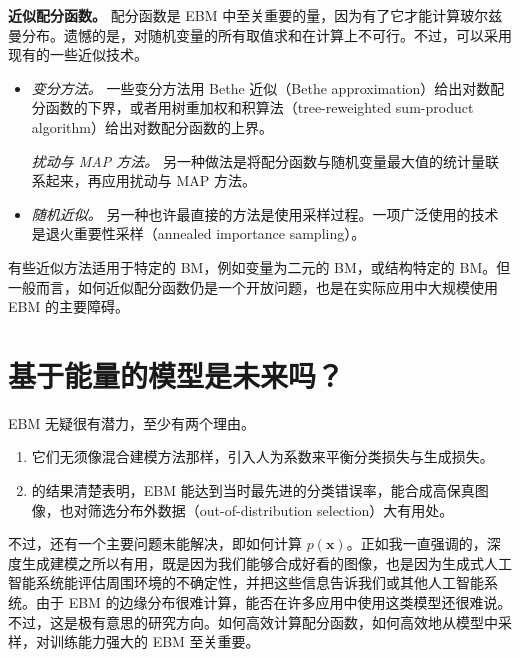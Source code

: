 \noindent\textbf{近似配分函数。} 配分函数是 EBM 中至关重要的量，因为有了它才能计算玻尔兹曼分布。遗憾的是，对随机变量的所有取值求和在计算上不可行。不过，可以采用现有的一些近似技术。
\begin{itemize}
\item \emph{变分方法。} 一些变分方法用 Bethe 近似（Bethe approximation）给出对数配分函数的下界，或者用树重加权和积算法（tree-reweighted sum-product algorithm）给出对数配分函数的上界。

\emph{扰动与 MAP 方法。} 另一种做法是将配分函数与随机变量最大值的统计量联系起来，再应用扰动与 MAP 方法。
\item \emph{随机近似。} 另一种也许最直接的方法是使用采样过程。一项广泛使用的技术是退火重要性采样（annealed importance sampling）。
\end{itemize}
有些近似方法适用于特定的 BM，例如变量为二元的 BM，或结构特定的 BM。但一般而言，如何近似配分函数仍是一个开放问题，也是在实际应用中大规模使用 EBM 的主要障碍。

\section{基于能量的模型是未来吗？}
EBM 无疑很有潜力，至少有两个理由。
\begin{enumerate}
\item 它们无须像混合建模方法那样，引入人为系数来平衡分类损失与生成损失。
\item {}的结果清楚表明，EBM 能达到当时最先进的分类错误率，能合成高保真图像，也对筛选分布外数据（out-of-distribution selection）大有用处。
\end{enumerate}

不过，还有一个主要问题未能解决，即如何计算 $p(\mathbf{x})$。正如我一直强调的，深度生成建模之所以有用，既是因为我们能够合成好看的图像，也是因为生成式人工智能系统能评估周围环境的不确定性，并把这些信息告诉我们或其他人工智能系统。由于 EBM 的边缘分布很难计算，能否在许多应用中使用这类模型还很难说。不过，这是极有意思的研究方向。如何高效计算配分函数，如何高效地从模型中采样，对训练能力强大的 EBM 至关重要。


